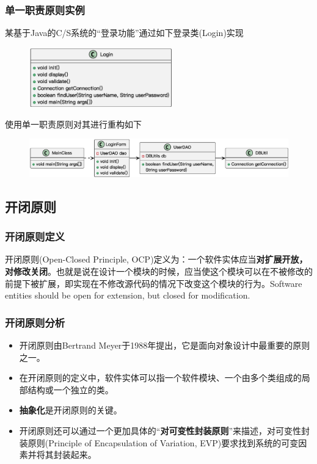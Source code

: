 \subsubsection{单一职责原则实例}
某基于Java的C/S系统的“登录功能”通过如下登录类(Login)实现
\begin{figure}[H]
    \vspace{-0.5em}
	\centering
	\includegraphics[width=0.55\textwidth]{images/单一职责原则实例1.eps}
    \vspace{-1em}
\end{figure}

使用单一职责原则对其进行重构如下
\begin{figure}[H]
    \vspace{-0.5em}
	\centering
	\includegraphics[width=\textwidth]{images/单一职责原则实例2.eps}
    \vspace{-1em}
\end{figure}

\subsection{开闭原则}

\subsubsection{开闭原则定义}
开闭原则(Open-Closed Principle, OCP)定义为：一个软件实体应当\textbf{对扩展开放，对修改关闭}。也就是说在设计一个模块的时候，应当使这个模块可以在不被修改的前提下被扩展，即实现在不修改源代码的情况下改变这个模块的行为。Software entities should be open for extension, but closed for modification.

\subsubsection{开闭原则分析}
\begin{itemize}
    \item 开闭原则由Bertrand Meyer于1988年提出，它是面向对象设计中最重要的原则之一。
    \item 在开闭原则的定义中，软件实体可以指一个软件模块、一个由多个类组成的局部结构或一个独立的类。
    \item \textbf{抽象化}是开闭原则的关键。
    \item 开闭原则还可以通过一个更加具体的“\textbf{对可变性封装原则}”来描述，对可变性封装原则(Principle of Encapsulation of Variation, EVP)要求找到系统的可变因素并将其封装起来。
\end{itemize}

